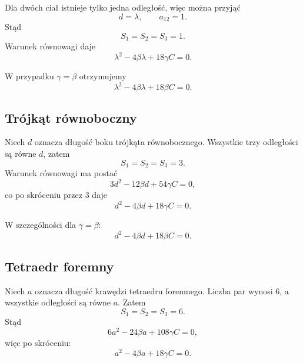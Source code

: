 \documentclass[11pt,a4paper]{article}
\theoremstyle{plain}
\theoremstyle{remark}
\begin{document}
Dla dwóch ciał istnieje tylko jedna odległość, więc można przyjąć
\begin{equation}
d = \lambda, \qquad a_{12}=1.
\end{equation}
Stąd
\begin{equation}
S_1=S_2=S_3=1.
\end{equation}
Warunek równowagi daje
\begin{equation}
\boxed{\lambda^2 - 4\beta \lambda + 18\gamma C = 0.}
\end{equation}

W przypadku $\gamma = \beta$ otrzymujemy
\begin{equation}
\lambda^2 - 4\beta \lambda + 18\beta C = 0.
\end{equation}

\subsection{Trójkąt równoboczny}

Niech $d$ oznacza długość boku trójkąta równobocznego. Wszystkie trzy odległości są równe $d$, zatem
\begin{equation}
S_1=S_2=S_3=3.
\end{equation}
Warunek równowagi ma postać
\begin{equation}
3d^2 - 12\beta d + 54\gamma C = 0,
\end{equation}
co po skróceniu przez $3$ daje
\begin{equation}
\boxed{d^2 - 4\beta d + 18\gamma C = 0.}
\end{equation}

W szczególności dla $\gamma = \beta$:
\begin{equation}
d^2 - 4\beta d + 18\beta C = 0.
\end{equation}

\subsection{Tetraedr foremny}

Niech $a$ oznacza długość krawędzi tetraedru foremnego. Liczba par wynosi $6$, a wszystkie odległości są równe $a$. Zatem
\begin{equation}
S_1=S_2=S_3=6.
\end{equation}
Stąd
\begin{equation}
6a^2 - 24\beta a + 108\gamma C = 0,
\end{equation}
więc po skróceniu:
\begin{equation}
\boxed{a^2 - 4\beta a + 18\gamma C = 0.}
\end{equation}
\end{document}
